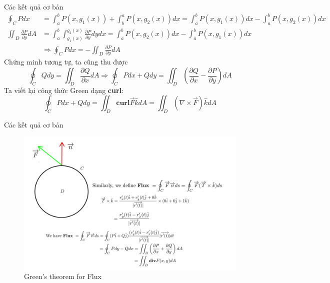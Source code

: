 \documentclass[8pt]{beamer}
\begin{document}
\begin{frame}{Các kết quả cơ bản}
\begin{equation*}
\begin{split}
	\oint_{C}Pdx &=\int_{a}^{b}P(x,g_{1}(x))+\int_{b}^{a}P(x,g_{2}(x))dx=\int_{a}^{b}P(x,g_{1}(x))dx-\int_{a}^{b}P(x,g_{2}(x))dx\\
	\iint_{D}\frac{\partial P}{\partial y}dA &=\int_{a}^{b}\int_{g_{1}(x)}^{g_{2}(x)}\frac{\partial P}{\partial y}dydx=\int_{a}^{b}P(x,g_{2}(x))dx-\int_{a}^{b}P(x,g_{1}(x))dx\\
						 &\Rightarrow\oint_{C}Pdx=-\iint_{D}\frac{\partial P}{\partial y}dA
\end{split}
\end{equation*}
Chứng minh tương tự, ta cũng thu được $$\oint_{C}Qdy=\iint_{D}\frac{\partial Q}{\partial x}dA\Rightarrow \oint_{C}Pdx+Qdy=\iint_{D}\left(\frac{\partial Q}{\partial x}-\frac{\partial P}{\partial y}\right)dA$$
Ta viết lại công thức Green dạng \textbf{curl}:
$$\oint_{C}Pdx+Qdy=\iint_{D}\textbf{curl}\overrightarrow{F}\hat kdA=\iint_{D}(\nabla \times \overrightarrow{F})\hat kdA$$
\end{frame}
\begin{frame}{Các kết quả cơ bản}
\begin{figure}[h]
			\includegraphics[width=1\textwidth]{flux.jpg}
			\caption{Green's theorem for Flux}			\label{fig:re4}
\end{figure}

\end{frame}
\end{document}
